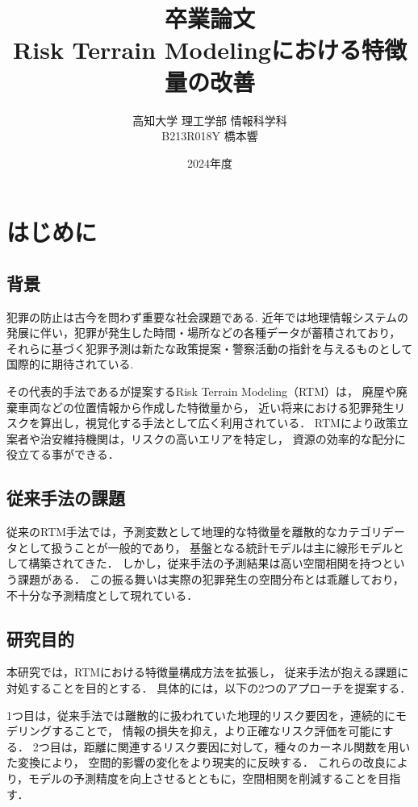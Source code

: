 \documentclass[12pt,a4paper,oneside]{jsbook}
\title{
卒業論文\\[1.5cm]
Risk Terrain Modelingにおける特徴量の改善\\[6cm]
}
\author{高知大学 理工学部 情報科学科\\[0.5cm]
B213R018Y 橋本響}
\date{2024年度}
\theoremstyle{plain}
\begin{document}
\maketitle
\tableofcontents

\chapter{はじめに}
\label{chapter_1}
\section{背景}
犯罪の防止は古今を問わず重要な社会課題である.
近年では地理情報システムの発展に伴い，犯罪が発生した時間・場所などの各種データが蓄積されており，
それらに基づく犯罪予測は新たな政策提案・警察活動の指針を与えるものとして国際的に期待されている.

その代表的手法である\citet{caplan2015risk}が提案するRisk Terrain Modeling（RTM）は，
廃屋や廃棄車両などの位置情報から作成した特徴量から，
近い将来における犯罪発生リスクを算出し，視覚化する手法として広く利用されている．
RTMにより政策立案者や治安維持機関は，リスクの高いエリアを特定し，
資源の効率的な配分に役立てる事ができる．

\section{従来手法の課題}
従来のRTM手法では，予測変数として地理的な特徴量を離散的なカテゴリデータとして扱うことが一般的であり，
基盤となる統計モデルは主に線形モデルとして構築されてきた．
しかし，従来手法の予測結果は高い空間相関を持つという課題がある．
この振る舞いは実際の犯罪発生の空間分布とは乖離しており，不十分な予測精度として現れている．

\section{研究目的}
本研究では，RTMにおける特徴量構成方法を拡張し，
従来手法が抱える課題に対処することを目的とする．
具体的には，以下の2つのアプローチを提案する．

1つ目は，従来手法では離散的に扱われていた地理的リスク要因を，連続的にモデリングすることで，
情報の損失を抑え，より正確なリスク評価を可能にする． 
2つ目は，距離に関連するリスク要因に対して，種々のカーネル関数を用いた変換により，
空間的影響の変化をより現実的に反映する．
これらの改良により，モデルの予測精度を向上させるとともに，空間相関を削減することを目指す．
\end{document}
